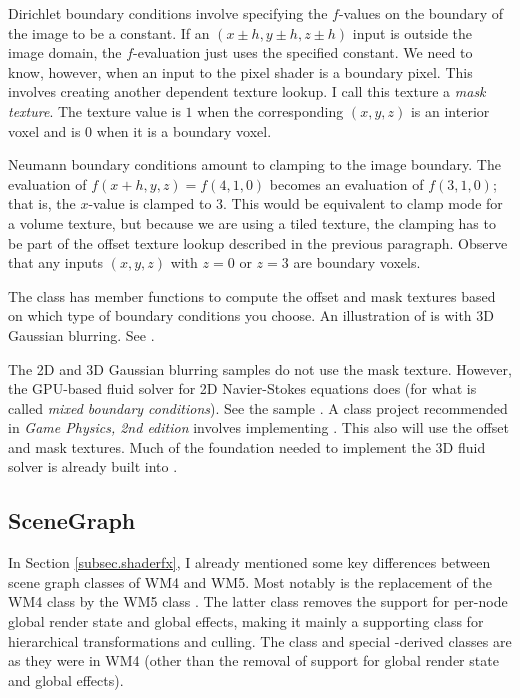 \documentclass{article}
\begin{document}
Dirichlet boundary conditions involve specifying the $f$-values on the
boundary of the image to be a constant.  If an $(x \pm h, y \pm h, z \pm h)$
input is outside the image domain, the $f$-evaluation just uses the
specified constant.  We need to know, however, when an input to the pixel
shader is a boundary pixel.  This involves creating another dependent texture
lookup.  I call this texture a {\em mask texture}.  The texture value is $1$
when the corresponding $(x,y,z)$ is an interior voxel and is $0$ when it is
a boundary voxel.

Neumann boundary conditions amount to clamping to the image boundary.
The evaluation of $f(x+h,y,z) = f(4,1,0)$ becomes an evaluation of
$f(3,1,0)$; that is, the $x$-value is clamped to $3$.  This would be
equivalent to clamp mode for a volume texture, but because we are using
a tiled texture, the clamping has to be part of the offset texture
lookup described in the previous paragraph.  Observe that any inputs
$(x,y,z)$ with $z = 0$ or $z = 3$ are boundary voxels.

The class  has member functions to compute the
offset and mask textures based on which type of boundary conditions
you choose.  An illustration of  is with 3D
Gaussian blurring.  See .

The 2D and 3D Gaussian blurring samples do not use the mask texture.  However,
the GPU-based fluid solver for 2D Navier-Stokes equations does (for what
is called {\em mixed boundary conditions}).  See the sample
.  A class project recommended in
{\em Game Physics, 2nd edition} involves implementing .
This also will use the offset and mask textures.  Much of the foundation
needed to implement the 3D fluid solver is already built into
.

\subsection{SceneGraph}

In Section \ref{subsec.shaderfx}, I already mentioned some key differences
between scene graph classes of WM4 and WM5.  Most notably is the replacement
of the WM4 class  by the WM5 class .  The
latter class removes the support for per-node global render state and global
effects, making it mainly a supporting class for hierarchical transformations
and culling.  The  class and special -derived classes
are as they were in WM4 (other than the removal of support for global
render state and global effects).
\end{document}
